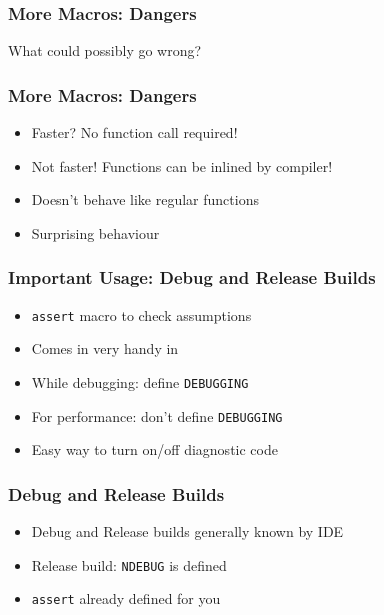 \begin{frame}
  \frametitle{More Macros: Dangers}
  \begin{center}
    What could possibly go wrong?
  \end{center}
  \vskip1cm
  \begin{overprint}
  \end{overprint}
\end{frame}

\begin{frame}
  \frametitle{More Macros: Dangers}
  \begin{itemize}
    \item Faster? No function call required!
    \item<2> Not faster! Functions can be inlined by compiler!
  \end{itemize}
  \vskip4mm
  \begin{itemize}
    \item Doesn't behave like regular functions
    \item Surprising behaviour
  \end{itemize}
\end{frame}

\begin{frame}
  \frametitle{Important Usage: Debug and Release Builds}
  \begin{itemize}
    \item {\tt assert} macro to check assumptions
    \item Comes in very handy in  \cpp
    \item While debugging: define {\tt DEBUGGING}
    \item For performance: don't define {\tt DEBUGGING}
    \item Easy way to turn on/off diagnostic code
  \end{itemize}
\end{frame}

\begin{frame}
  \frametitle{Debug and Release Builds}
  \begin{itemize}
    \item Debug and Release builds generally known by IDE
    \item Release build: {\tt NDEBUG} is defined
    \item {\tt assert} already defined for you
  \end{itemize}
\end{frame}





